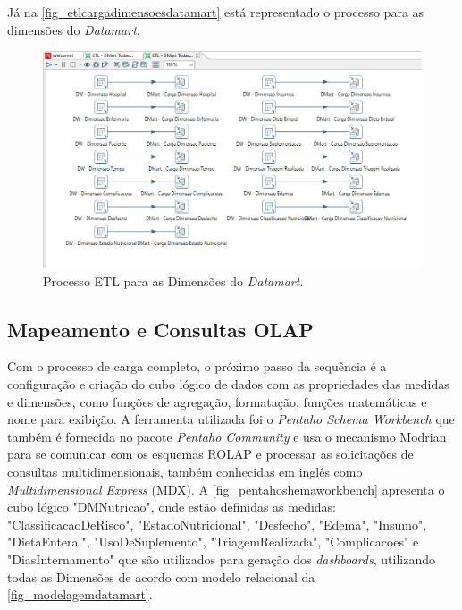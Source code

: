 Já na \autoref{fig_etlcargadimensoesdatamart} está representado o processo para as dimensões do \textit{Datamart}.
\begin{figure}[htb]
	\caption{\label{fig_etlcargadimensoesdatamart}Processo ETL para as Dimensões do \textit{Datamart}.}
	\begin{center}
	    \includegraphics[scale=0.56]{Imagens/figura - etl dm dimensoes.png}
	\end{center}
\end{figure}
\clearpage

\subsection{Mapeamento e Consultas OLAP}
Com o processo de carga completo, o próximo passo da sequência é a configuração e criação do cubo lógico de dados com as propriedades das medidas e dimensões, como funções de agregação, formatação, funções matemáticas e nome para exibição. A ferramenta utilizada foi o \textit{Pentaho Schema Workbench} que também é fornecida no pacote \textit{Pentaho Community} e usa o mecanismo Modrian para se comunicar com os esquemas ROLAP e processar as solicitações de consultas multidimensionais, também conhecidas em inglês como \textit{Multidimensional Express} (MDX). A \autoref{fig_pentahoshemaworkbench} apresenta o cubo lógico "DMNutricao", onde estão definidas as medidas: "ClassificacaoDeRisco", "EstadoNutricional", "Desfecho", "Edema", "Insumo", "DietaEnteral", "UsoDeSuplemento", "TriagemRealizada", "Complicacoes" e "DiasInternamento" que são utilizados para geração dos \textit{dashboards}, utilizando todas as Dimensões de acordo com modelo relacional da \autoref{fig_modelagemdatamart}.

